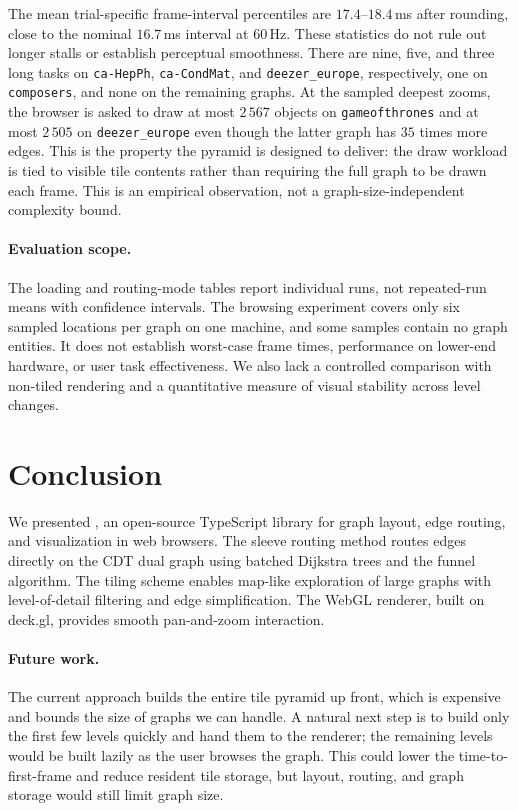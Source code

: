 \documentclass[review]{vgtc}          %
\newcommand{\msagljs}{\textsf{\libname}}
\begin{document}
The mean trial-specific frame-interval percentiles are
$17.4$--$18.4$\,ms after rounding, close to the nominal
$16.7$\,ms interval at $60$\,Hz. These statistics do not rule out
longer stalls or establish perceptual smoothness. There are nine,
five, and three long tasks on \texttt{ca-HepPh},
\texttt{ca-CondMat}, and \texttt{deezer\_europe}, respectively,
one on \texttt{composers}, and none on the remaining graphs.
At the sampled deepest zooms, the browser is asked to draw at most
$2\,567$ objects on \texttt{gameofthrones} and at most $2\,505$ on
\texttt{deezer\_europe} even though the latter graph has $35$ times
more edges. This is the property the pyramid is designed to deliver:
the draw workload is tied to visible tile contents rather than
requiring the full graph to be drawn each frame. This is an
empirical observation, not a graph-size-independent complexity bound.

\paragraph{Evaluation scope.}
The loading and routing-mode tables report individual runs, not
repeated-run means with confidence intervals. The browsing experiment
covers only six sampled locations per graph on one machine, and
some samples contain no graph entities. It does not establish
worst-case frame times, performance on lower-end hardware, or user
task effectiveness. We also lack a controlled comparison with
non-tiled rendering and a quantitative measure of visual stability
across level changes.

\section{Conclusion}
\label{sec:conclusion}

We presented \msagljs{}, an open-source TypeScript library for graph layout, edge routing, and visualization in web browsers. The sleeve routing method routes edges directly on the CDT dual graph using batched Dijkstra trees and the funnel algorithm. The tiling scheme enables map-like exploration of large graphs with level-of-detail filtering and edge simplification. The WebGL renderer, built on deck.gl, provides smooth pan-and-zoom interaction.

\paragraph{Future work.} The current approach builds the entire tile
pyramid up front, which is expensive and bounds the size of graphs we
can handle. A natural next step is to build only the first few levels
quickly and hand them to the renderer; the remaining levels would be
built lazily as the user browses the graph. This
could lower the time-to-first-frame and reduce resident tile storage,
but layout, routing, and graph storage would still limit graph size.
\end{document}
